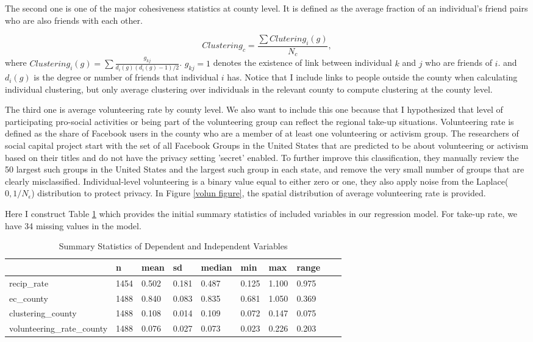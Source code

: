 \documentclass{article}
\begin{document}
The second one is one of the major cohesiveness statistics at county level. It is defined as the average fraction of an individual's friend pairs who are also friends with each other.

$$Clustering_c=\frac{\sum{Clutering_i(g)}}{N_c},$$
where $Clustering_i(g)=\sum{\frac{g_{kj}}{d_i(g)(d_i(g)-1)/2}}$. $g_{kj}=1$ denotes the existence of link between individual $k$ and $j$ who are friends of $i$. and $d_i(g)$ is the degree or number of friends that individual $i$ has. Notice that I include links to people outside the county when calculating individual clustering, but only average clustering
over individuals in the relevant county to compute clustering at the
county level.

The third one is average volunteering rate by county level.  We also want to include this one because that I hypothesized that level of participating pro-social activities or being part of the volunteering group can reflect the regional take-up situations. Volunteering rate is defined as the share of Facebook users in the county who are a member of at least one volunteering or activism group. The researchers of social capital project start with the set of all Facebook Groups in the United States that are predicted to be about volunteering or activism based on their titles and do not have the privacy setting 'secret' enabled. To further improve this classification, they manually review the 50 largest such groups in the United States and the largest such group in each state, and remove the very small number of groups that are clearly misclassified. Individual-level volunteering is a binary value equal to either zero or one, they also apply noise from the Laplace($0, 1/N_\epsilon$) distribution to protect privacy. In Figure \ref{volun figure}, the spatial distribution of average volunteering rate is provided.

Here I construct Table \ref{summ stats} which provides the initial summary statistics of included variables in our regression model. For take-up rate, we have 34 missing values in the model.


\begin{table}
\centering
\begin{tabular}[h]{|m|m|m|m|m|m|m|m|m|m|}
\hline
  & n & mean & sd & median & min & max & range\\
\hline
recip\_rate & 1454 & 0.502 & 0.181 & 0.487 & 0.125 & 1.100 & 0.975\\
\hline
ec\_county & 1488 & 0.840 & 0.083 & 0.835 & 0.681 & 1.050 & 0.369\\
\hline
clustering\_county & 1488 & 0.108 & 0.014 & 0.109 & 0.072 & 0.147 & 0.075\\
\hline
volunteering\_rate\_county & 1488 & 0.076 & 0.027 & 0.073 & 0.023 & 0.226 & 0.203\\
\hline
\end{tabular}
\caption{Summary Statistics of Dependent and Independent Variables}
\label{summ stats}
\end{table}
\end{document}
